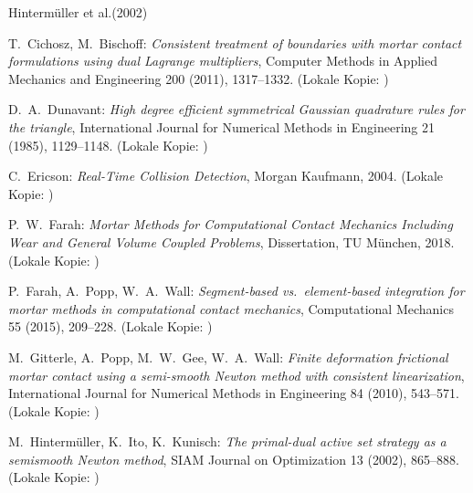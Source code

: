 \documentclass[a4paper,11pt]{article}
\begin{document}
\clearpage
\begin{thebibliography}{Hintermüller et al.(2002)}

 T.~Cichosz, M.~Bischoff: \emph{Consistent treatment of boundaries with mortar contact formulations using dual Lagrange multipliers}, Computer Methods in Applied Mechanics and Engineering 200 (2011), 1317--1332. (Lokale Kopie: )

 D.~A.~Dunavant: \emph{High degree efficient symmetrical Gaussian quadrature rules for the triangle}, International Journal for Numerical Methods in Engineering 21 (1985), 1129--1148. (Lokale Kopie: )

 C.~Ericson: \emph{Real-Time Collision Detection}, Morgan Kaufmann, 2004. (Lokale Kopie: )

 P.~W.~Farah: \emph{Mortar Methods for Computational Contact Mechanics Including Wear and General Volume Coupled Problems}, Dissertation, TU M\"unchen, 2018. (Lokale Kopie: )

 P.~Farah, A.~Popp, W.~A.~Wall: \emph{Segment-based vs.\ element-based integration for mortar methods in computational contact mechanics}, Computational Mechanics 55 (2015), 209--228. (Lokale Kopie: )

 M.~Gitterle, A.~Popp, M.~W.~Gee, W.~A.~Wall: \emph{Finite deformation frictional mortar contact using a semi-smooth Newton method with consistent linearization}, International Journal for Numerical Methods in Engineering 84 (2010), 543--571. (Lokale Kopie: )

 M.~Hintermüller, K.~Ito, K.~Kunisch: \emph{The primal-dual active set strategy as a semismooth Newton method}, SIAM Journal on Optimization 13 (2002), 865--888. (Lokale Kopie: )


\end{thebibliography}
\end{document}
